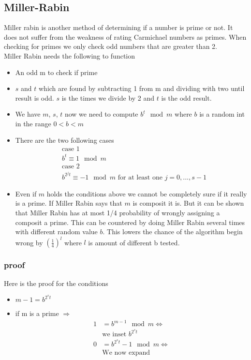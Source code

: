 \subsection{Miller-Rabin}
Miller rabin is another method of determining if a number is prime or not. It does not suffer from the weakness of rating Carmichael numbers as primes. When checking for primes we only check odd numbers that are greater than 2.\\
Miller Rabin needs the following to function
\begin{itemize}
\item An odd m to check if prime
\item $s$ and $t$ which are found by subtracting 1 from m and dividing with two until result is odd. $s$ is the times we divide by 2 and $t$ is the odd result.
\item We have $m$, $s$, $t$ now we need to compute $b^t\mod m$ where $b$ is a random int in the range $0<b<m$
\item There are the two following cases
\begin{align*}
&\mbox{case 1}\\
&b^t \equiv 1 \mod m\\
&\mbox{case 2}\\
&b^{2^{j}t} \equiv -1 \mod m \mbox{ for at least one $j=0,...,s-1$}
\end{align*}
\item Even if $m$ holds the conditions above we cannot be completely sure if it really is a prime. If Miller Rabin says that $m$ is composit it is. But it can be shown that Miller Rabin has at most 1/4 probability of wrongly assigning a composit a prime. This can be countered by doing Miller Rabin several times with different random value $b$. This lowers the chance of the algorithm begin wrong by $(\frac{1}{4})^l$ where $l$ is amount of different b tested.
\end{itemize}
\subsubsection*{proof}
Here is the proof for the conditions
\begin{itemize}
\item $m-1=b^{2^st}$
\item if m is a prime $\Rightarrow$
\begin{align*}
1&=b^{m-1}\mod m \Leftrightarrow\\
&\mbox{we inset $b^{2^st}$}\\
0&=b^{2^st}-1\mod m \Leftrightarrow\\
&\mbox{We now expand}\\
\end{align*}
\end{itemize}